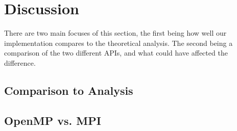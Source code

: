 \documentclass[a4paper]{article}
\begin{document}
\section{Discussion}
There are two main focuses of this section, the first being how well our implementation compares to the theoretical analysis. The second being a comparison of the two different APIs, and what could have affected the difference.
\subsection{Comparison to Analysis}

\subsection{OpenMP vs. MPI}

\end{document}

